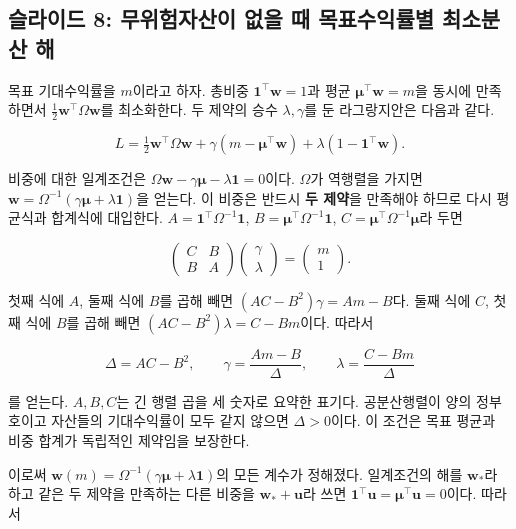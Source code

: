 \documentclass[11pt,a4paper]{article}
\begin{document}
\subsection{슬라이드 8: 무위험자산이 없을 때 목표수익률별 최소분산 해}

목표 기대수익률을 $m$이라고 하자. 총비중 $\mathbf 1^\top\mathbf w=1$과 평균 $\boldsymbol\mu^\top\mathbf w=m$을 동시에 만족하면서 $\tfrac12\mathbf w^\top\Omega\mathbf w$를 최소화한다. 두 제약의 승수 $\lambda,\gamma$를 둔 라그랑지안은 다음과 같다.
\par

\[
L=\tfrac12\mathbf w^\top\Omega\mathbf w
+\gamma(m-\boldsymbol\mu^\top\mathbf w)
+\lambda(1-\mathbf 1^\top\mathbf w).
\]

비중에 대한 일계조건은 $\Omega\mathbf w-\gamma\boldsymbol\mu-\lambda\mathbf1=0$이다. $\Omega$가 역행렬을 가지면 $\mathbf w=\Omega^{-1}(\gamma\boldsymbol\mu+\lambda\mathbf1)$을 얻는다. 이 비중은 반드시 \textbf{두 제약}을 만족해야 하므로 다시 평균식과 합계식에 대입한다. $A=\mathbf1^\top\Omega^{-1}\mathbf1$, $B=\boldsymbol\mu^\top\Omega^{-1}\mathbf1$, $C=\boldsymbol\mu^\top\Omega^{-1}\boldsymbol\mu$라 두면
\par

\[
\begin{pmatrix}C&B\\B&A\end{pmatrix}
\begin{pmatrix}\gamma\\\lambda\end{pmatrix}
=\begin{pmatrix}m\\1\end{pmatrix}.
\]

첫째 식에 $A$, 둘째 식에 $B$를 곱해 빼면 $(AC-B^2)\gamma=Am-B$다. 둘째 식에 $C$, 첫째 식에 $B$를 곱해 빼면 $(AC-B^2)\lambda=C-Bm$이다. 따라서
\par

\[
\Delta=AC-B^2,\qquad
\gamma=\frac{Am-B}{\Delta},\qquad
\lambda=\frac{C-Bm}{\Delta}
\]

를 얻는다. $A,B,C$는 긴 행렬 곱을 세 숫자로 요약한 표기다. 공분산행렬이 양의 정부호이고 자산들의 기대수익률이 모두 같지 않으면 $\Delta>0$이다. 이 조건은 목표 평균과 비중 합계가 독립적인 제약임을 보장한다.
\par

이로써 $\mathbf w(m)=\Omega^{-1}(\gamma\boldsymbol\mu+\lambda\mathbf1)$의 모든 계수가 정해졌다. 일계조건의 해를 $\mathbf w_*$라 하고 같은 두 제약을 만족하는 다른 비중을 $\mathbf w_*+\mathbf u$라 쓰면 $\mathbf1^\top\mathbf u=\boldsymbol\mu^\top\mathbf u=0$이다. 따라서
\par
\end{document}
